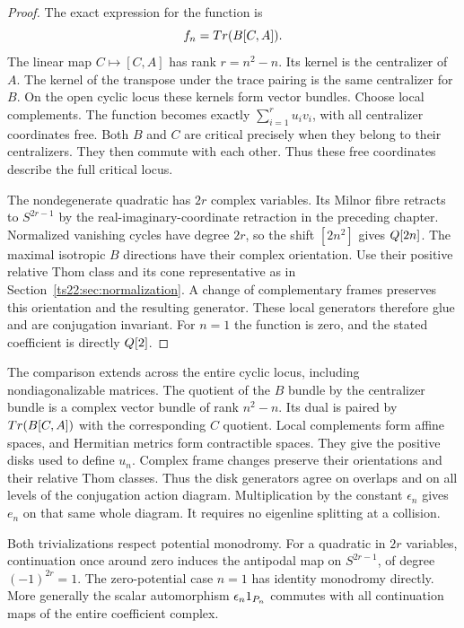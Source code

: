\begin{proof}
The exact expression for the function is
\[
                         f_n=Tr(B[C,A]).
\]
The linear map $C\mapsto[C,A]$ has rank $r=n^2-n$.
Its kernel is the centralizer of $A$. The kernel of the transpose
under the trace pairing is the same centralizer for $B$.
On the open cyclic locus these kernels form vector bundles.
Choose local complements. The function becomes exactly
$\sum_{i=1}^r u_i v_i$, with all centralizer coordinates free.
Both $B$ and $C$ are critical precisely when they belong to their
centralizers. They then commute with each other. Thus these free
coordinates describe the full critical locus.

The nondegenerate quadratic has $2r$ complex variables. Its Milnor
fibre retracts to $S^{2r-1}$ by the real-imaginary-coordinate
retraction in the preceding chapter. Normalized vanishing cycles
have degree $2r$, so the shift $[2n^2]$ gives $Q[2n]$.
The maximal isotropic $B$ directions have their complex orientation.
Use their positive relative Thom class and its cone representative
as in Section~\ref{ts22:sec:normalization}.
A change of complementary frames preserves this orientation and
the resulting generator. These local generators therefore glue
and are conjugation invariant. For $n=1$ the function is zero,
and the stated coefficient is directly $Q[2]$.
\end{proof}


The comparison extends across the entire cyclic locus, including
nondiagonalizable matrices. The quotient of the $B$ bundle by the
centralizer bundle is a complex vector bundle of rank $n^2-n$.
Its dual is paired by $Tr(B[C,A])$ with the corresponding $C$ quotient.
Local complements form affine spaces, and Hermitian metrics form
contractible spaces. They give the positive disks used to define $u_n$.
Complex frame changes preserve their orientations and their relative
Thom classes. Thus the disk generators agree on overlaps and on
all levels of the conjugation action diagram.
Multiplication by the constant $\epsilon_n$ gives $e_n$ on that
same whole diagram. It requires no eigenline splitting at a collision.

Both trivializations respect potential monodromy. For a quadratic
in $2r$ variables, continuation once around zero induces the antipodal
map on $S^{2r-1}$, of degree $(-1)^{2r}=1$.
The zero-potential case $n=1$ has identity monodromy directly.
More generally the scalar automorphism $\epsilon_n1_{P_n}$
commutes with all continuation maps of the entire coefficient complex.

